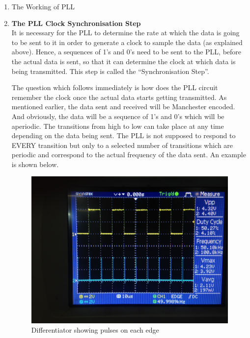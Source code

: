 \documentclass{article}
\begin{document}
\begin{enumerate}[label=(\Alph*)]
\item The Working of PLL
\item \textbf{The PLL Clock Synchronisation Step}\\
  It is necessary for the PLL to determine the rate at which the data is going to be sent to it in order to generate a clock to sample the data (as explained above). Hence, a sequences of 1’s and 0’s need to be sent to the PLL, before the actual data is sent, so that it can determine the clock at which data is being transmitted. This step is called the “Synchronisation Step”. 

The question which follows immediately is how does the PLL circuit remember the clock once the actual data starts getting transmitted. As mentioned earlier, the data sent and received will be Manchester encoded. And obviously, the data will be a sequence of 1’s and 0’s which will be aperiodic. The transitions from high to low can take place at any time depending on the data being sent. The PLL is not supposed to respond to EVERY transition but only to a selected number of transitions which are periodic and correspond to the actual frequency of the data sent. An example is shown below.


\begin{figure}[h]

	\centering
	\includegraphics[scale = 0.4]{images/Diff_all_pulses.JPG}
	\caption{Differentiator showing pulses on each edge}
	\label{Fig :1b}



\end{figure}
\end{enumerate}
\end{document}
